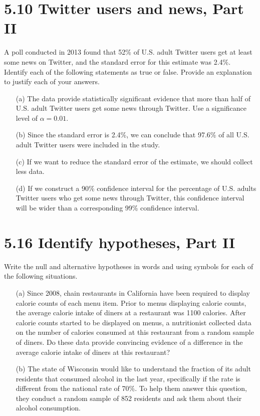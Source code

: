 \documentclass{article}
\begin{document}
\section*{5.10 Twitter users and news, Part II}
A poll conducted in 2013 found that 52\% of U.S. adult Twitter users get at least some news on Twitter, and the standard error for this estimate was 2.4\%. Identify each of the following statements as true or false. Provide an explanation to justify each of your answers.
\begin{itemize}
    \item[(a)] The data provide statistically significant evidence that more than half of U.S. adult Twitter users get some news through Twitter. Use a significance level of \(\alpha = 0.01\).
    \item[(b)] Since the standard error is 2.4\%, we can conclude that 97.6\% of all U.S. adult Twitter users were included in the study.
    \item[(c)] If we want to reduce the standard error of the estimate, we should collect less data.
    \item[(d)] If we construct a 90\% confidence interval for the percentage of U.S. adults Twitter users who get some news through Twitter, this confidence interval will be wider than a corresponding 99\% confidence interval.
\end{itemize}


\section*{5.16 Identify hypotheses, Part II}
Write the null and alternative hypotheses in words and using symbols for each of the following situations.
\begin{itemize}
    \item[(a)] Since 2008, chain restaurants in California have been required to display calorie counts of each menu item. Prior to menus displaying calorie counts, the average calorie intake of diners at a restaurant was 1100 calories. After calorie counts started to be displayed on menus, a nutritionist collected data on the number of calories consumed at this restaurant from a random sample of diners. Do these data provide convincing evidence of a difference in the average calorie intake of diners at this restaurant?
    \item[(b)] The state of Wisconsin would like to understand the fraction of its adult residents that consumed alcohol in the last year, specifically if the rate is different from the national rate of 70\%. To help them answer this question, they conduct a random sample of 852 residents and ask them about their alcohol consumption.
\end{itemize}
\end{document}
